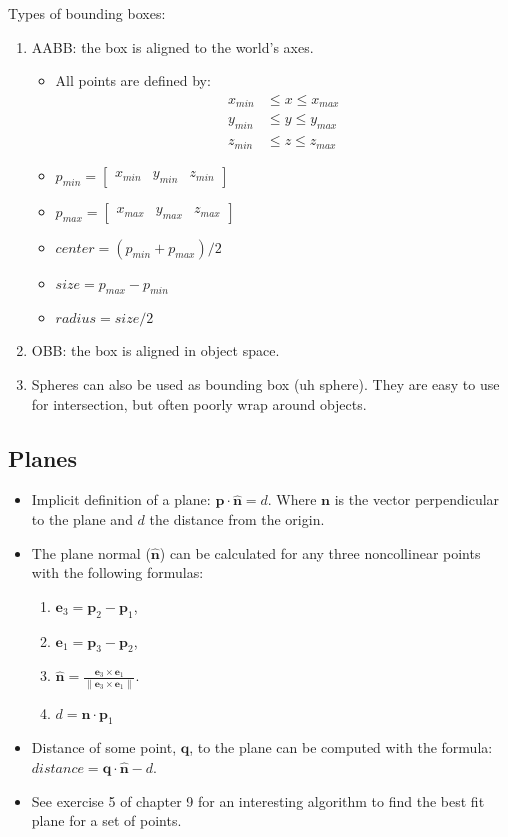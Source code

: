 Types of bounding boxes:
\begin{enumerate}
	\item AABB: the box is aligned to the world's axes.
	\begin{itemize}
		\item All points are defined by:
		\begin{align*}
			x_{min} &\leq x \leq x_{max} \\ 
			y_{min} &\leq y \leq y_{max} \\
			z_{min} &\leq z \leq z_{max}
		\end{align*}
		\item $p_{min}=\begin{bmatrix}
			x_{min} & y_{min} & z_{min}
		\end{bmatrix}$
		\item $p_{max}=\begin{bmatrix}
			x_{max} & y_{max} & z_{max}
		\end{bmatrix}$
		\item $center= (p_{min} + p_{max}) / 2$
		\item $size = p_{max} - p_{min}$
		\item $radius = size / 2$
	\end{itemize}
	\item OBB: the box is aligned in object space.
	\item Spheres can also be used as bounding box (uh sphere). They are easy to use for intersection, but often poorly wrap around objects.
\end{enumerate}

\subsection{Planes}

\begin{itemize}
	\item Implicit definition of a plane: $\textbf{p} \cdot \hat{\textbf{n}}=d$. Where $\textbf{n}$ is the vector perpendicular to the plane and $d$ the distance from the origin.
	\item The plane normal ($\hat{\textbf{n}}$) can be calculated for any three noncollinear points with the following formulas:
	\begin{enumerate}
		\item $\textbf{e}_3 = \textbf{p}_2 - \textbf{p}_1$,
		\item $\textbf{e}_1 = \textbf{p}_3 - \textbf{p}_2$,
		\item $\hat{\textbf{n}}=\frac{\textbf{e}_3 \times \textbf{e}_1}{\| \textbf{e}_3 \times \textbf{e}_1 \|}$.
		\item $d=\hat{\textbf{n}} \cdot \textbf{p}_1$
	\end{enumerate}
	\item Distance of some point, $\textbf{q}$, to the plane can be computed with the formula: $distance = \textbf{q} \cdot \hat{\textbf{n}} - d$.
	\item See exercise 5 of chapter 9 for an interesting algorithm to find the best fit plane for a set of points.
\end{itemize}

